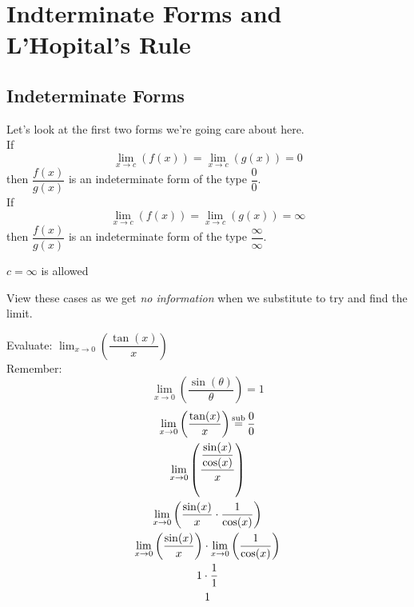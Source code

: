 
\section{Indterminate Forms and L'Hopital's Rule}
\subsection{Indeterminate Forms}
Let's look at the first two forms we're going care about here.\\
If
\begin{equation*}
    \lim_{x \to c}\left(f(x)\right) = \lim_{x \to c}\left(g(x)\right) = 0
\end{equation*}
then $\dfrac{f(x)}{g(x)}$ is an indeterminate form of the type $\dfrac{0}{0}$.\\
If
\begin{equation*}
    \lim_{x \to c}\left(f(x)\right) = \lim_{x \to c}\left(g(x)\right) = \infty
\end{equation*}
then $\dfrac{f(x)}{g(x)}$ is an indeterminate form of the type $\dfrac{\infty}{\infty}$.
\begin{note}
    $c = \infty$ is allowed
\end{note}
View these cases as we get \textit{no information} when we substitute to try and find the limit.
\begin{example}
    Evaluate: $\lim_{x \to 0}\left(\dfrac{\tan(x)}{x}\right)$ \\
    Remember:
    \begin{equation*}
        \lim_{x \to 0}\left(\dfrac{\sin(\theta)}{\theta}\right) = 1
    \end{equation*}
    \begin{gather*}
        \lim_{x \to 0}\left(\dfrac{\tan(x)}{x}\right) \operatorname{\overset{\mathrm{sub}}{=}} \dfrac{0}{0} \\
        \lim_{x \to 0}\left(\dfrac{\dfrac{\sin(x)}{\cos(x)}}{x}\right) \\
        \lim_{x \to 0}\left(\dfrac{\sin(x)}{x} \cdot \dfrac{1}{\cos(x)}\right) \\
        \lim_{x \to 0}\left(\dfrac{\sin(x)}{x}\right) \cdot \lim_{x \to 0}\left(\dfrac{1}{\cos(x)}\right)\\
        1 \cdot \dfrac{1}{1}\\
        1
    \end{gather*}
\end{example}
